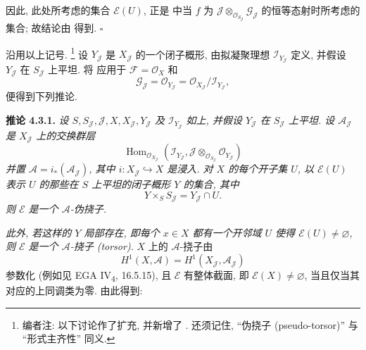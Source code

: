 因此, 此处所考虑的集合 \(\mathcal E(U)\),
正是  中当 \(f\) 为
\(\mathscr J\otimes_{\mathscr O_{S_{\mathscr J}}}
\mathscr G_{\mathscr J}\) 的恒等态射时所考虑的集合;
故结论由  得到.
\hfill\(\square\)

沿用以上记号.
\footnote{编者注: 以下讨论作了扩充, 并新增了
.
还须记住, ``伪挠子 (pseudo-torsor)'' 与 ``形式主齐性'' 同义.}
设 \(Y_{\mathscr J}\) 是 \(X_{\mathscr J}\) 的一个闭子概形,
由拟凝聚理想 \(\mathscr I_{Y_{\mathscr J}}\) 定义,
并假设 \(Y_{\mathscr J}\) 在 \(S_{\mathscr J}\) 上平坦.
将  应用于
\(\mathscr F=\mathscr O_X\) 和
\[
 \mathscr G_{\mathscr J}=\mathscr O_{Y_{\mathscr J}}
 =\mathscr O_{X_{\mathscr J}}/\mathscr I_{Y_{\mathscr J}},
\]
便得到下列推论.

\medskip
\noindent{}\textbf{推论 4.3.1.}
\textit{设 \(S,S_{\mathscr J},\mathscr J,X,X_{\mathscr J},
Y_{\mathscr J}\) 及 \(\mathscr I_{Y_{\mathscr J}}\) 如上,
并假设 \(Y_{\mathscr J}\) 在 \(S_{\mathscr J}\) 上平坦.
设 \(\mathscr A_{\mathscr J}\) 是 \(X_{\mathscr J}\) 上的交换群层
\[
 \operatorname{Hom}_{\mathscr O_{X_{\mathscr J}}}
 \left(
  \mathscr I_{Y_{\mathscr J}},
  \mathscr J\otimes_{\mathscr O_{S_{\mathscr J}}}
  \mathscr O_{Y_{\mathscr J}}
 \right)
\]
并置 \(\mathscr A=i_*(\mathscr A_{\mathscr J})\),
其中 \(i:X_{\mathscr J}\hookrightarrow X\) 是浸入.
对 \(X\) 的每个开子集 \(U\), 以 \(\mathcal E(U)\) 表示
\(U\) 的那些在 \(S\) 上平坦的闭子概形 \(Y\) 的集合, 其中
\[
 Y\times_S S_{\mathscr J}=Y_{\mathscr J}\cap U.
\]
则 \(\mathcal E\) 是一个 \(\mathscr A\)-伪挠子.}

\textit{此外, 若这样的 \(Y\) 局部存在,
即每个 \(x\in X\) 都有一个开邻域 \(U\) 使得
\(\mathcal E(U)\ne\varnothing\), 则 \(\mathcal E\) 是一个
\(\mathscr A\)-挠子 (torsor).}
\(X\) 上的 \(\mathscr A\)-挠子由
\[
 H^1(X,\mathscr A)=H^1(X_{\mathscr J},\mathscr A_{\mathscr J})
\]
参数化 (例如见 EGA IV\textsubscript{4}, 16.5.15),
且 \(\mathcal E\) 有整体截面, 即 \(\mathcal E(X)\ne\varnothing\),
当且仅当其对应的上同调类为零. 由此得到:

